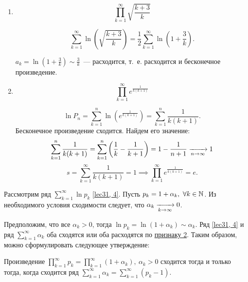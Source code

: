 \documentclass[../../main.tex]{subfiles}
\begin{document}
	\begin{examples}
	
		~
	
		\begin{enumerate}[label=\arabic*)]
			\item \[\prod\limits_{k = 1}^{\infty} \sqrt{\frac{k + 3}{k}}\]
			
			\[\sum\limits_{k = 1}^{\infty} \ln \left(\sqrt{\frac{k + 3}{k}}\right) = 
			\frac{1}{2} 
			\sum\limits_{k = 1}^{\infty} \ln\left(1 + \frac{3}{k}\right). \]
			
			$\displaystyle a_k = \ln \left(1 + \frac{3}{k}\right) \sim \frac{3}{k}$~--- 
			расходится, 
			т.~е. расходится и бесконечное произведение.
			
			\item \[\prod\limits_{k = 1}^{\infty} e^{\frac{1}{k(k + 1)}} \]
			
			\[\ln P_n = \sum\limits_{k = 1}^{n} \ln \left(e^{\frac{1}{k(k + 1)}}\right) 
			= \sum\limits_{k = 1}^{n} \frac{1}{k(k + 1)}.\]
			Бесконечное произведение сходится. Найдем его значение:
			\[\sum\limits_{k = 1}^{n} \frac{1}{k(k + 1)} = \sum\limits_{k = 1}^{n} 
			\left(\frac{1}{k} - \frac{1}{k + 1} \right) = 1 - \frac{1}{n + 1} \xrightarrow[n 
			\to \infty]{} 1 \]
			\[s = \sum\limits_{k = 1}^{\infty} \frac{1}{k(k + 1)} = 1 \implies 
			\prod\limits_{k = 1}^{\infty} e^{\frac{1}{k(k + 1)}} = e.\]
		\end{enumerate}
	\end{examples}

	Рассмотрим ряд $\sum\limits_{k = 1}^{\infty} \ln p_k$ \eqref{lec31, 4}. Пусть 
	$p_k = 1 + \alpha_k,\ \forall k\in\mathbb{N}$. Из необходимого условия сходимости 
	следует, 
	что $\alpha_k \xrightarrow[k \to \infty]{} 0$.
	
	Предположим, что все $\alpha_k > 0$, 
	тогда ${\ln p_k = \ln (1 + \alpha_k) \sim \alpha_k}$.
	Ряд \eqref{lec31, 4} и ряд $\sum\limits_{k = 1}^{\infty} \alpha_k$ оба 
	сходятся или оба расходятся по \hyperref[lec26:comp_test_2]{признаку 
	2\textdegree}. Таким образом, можно сформулировать
	следующее утверждение:
	
	\begin{thm}\label{lec31:thm2} 
		Произведение $\prod\limits_{k = 1}^{\infty} p_k = \prod\limits_{k = 
		1}^{\infty}(1 + \alpha_k),\ \alpha_k > 0$ сходится тогда и только тогда, 
		когда сходится ряд $\sum\limits_{k = 1}^{\infty} \alpha_k = \sum\limits_{k = 
		1}^{\infty} (p_k - 1)$.
	\end{thm}
\end{document}
